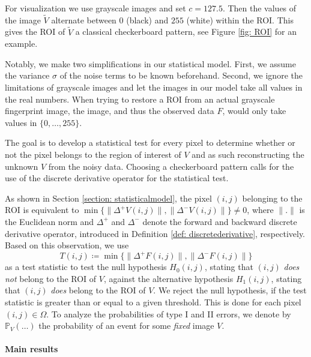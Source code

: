 \documentclass[a4paper,12pt]{article}
\newcommand{\norm}[1]{\lVert#1\rVert}
\theoremstyle{plain}
\theoremstyle{definition}
\numberwithin{equation}{section}
\begin{document}
For visualization we use grayscale images and set $c = 127.5$. Then the values of the image $\tilde{V}$ alternate between $0$ (black) and $255$ (white) within the ROI. This gives the ROI of $\tilde{V}$ a classical checkerboard pattern, see Figure \ref{fig: ROI} for an example.

Notably, we make two simplifications in our statistical model. First, we assume the variance $\sigma$ of the noise terms to be known beforehand. Second, we ignore the limitations of grayscale images and let the images in our model take all values in the real numbers. When trying to restore a ROI from an actual grayscale fingerprint image, the image, and thus the observed data $F$, would only take values in $\{ 0, \dots, 255 \}$.

The goal is to develop a statistical test for every pixel to determine whether or not the pixel belongs to the region of interest of $V$ and as such reconstructing the unknown $V$ from the noisy data. Choosing a checkerboard pattern calls for the use of the discrete derivative operator for the statistical test.

As shown in Section \ref{section: statisticalmodel}, the pixel $(i, j)$ belonging to the ROI is equivalent to $\min \{ \norm{\Delta^+ V(i, j)}, \norm{\Delta^- V(i, j)} \} \neq 0$, where $\norm{.}$ is the Euclidean norm and $\Delta^+$ and $\Delta^-$ denote the forward and backward discrete derivative operator, introduced in Definition \ref{def: discretederivative}, respectively. Based on this observation, we use
\begin{equation*}
	T(i, j) \coloneqq \min \{ \norm{\Delta^+ F(i, j)}, \norm{\Delta^- F(i, j)} \}
\end{equation*}
as a test statistic to test the null hypothesis $H_0(i, j)$, stating that $(i, j)$ \emph{does not} belong to the ROI of $V$, against the alternative hypothesis $H_1(i, j)$, stating that $(i, j)$ \emph{does} belong to the ROI of $V$. We reject the null hypothesis, if the test statistic is greater than or equal to a given threshold. This is done for each pixel $(i, j) \in \Omega$. To analyze the probabilities of type I and II errors, we denote by $\mathbb{P}_V( \ldots )$ the probability of an event for some \emph{fixed} image $V$.

\paragraph{Main results}
\end{document}
